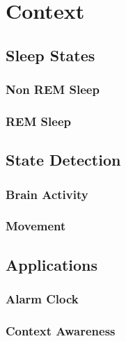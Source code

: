 \chapter{Context} %
\label{cha:context}

\section{Sleep States} %
\label{sec:sleep_states}

\subsection{Non REM Sleep} %
\label{sub:non_rem_sleep}


\subsection{REM Sleep} %
\label{sub:rem_sleep}



\section{State Detection} %
\label{sec:state_detection}

\subsection{Brain Activity} %
\label{sub:brain_activity}


\subsection{Movement} %
\label{sub:movement}



\section{Applications} %
\label{sec:applications}

\subsection{Alarm Clock} %
\label{sub:alarm_clock}


\subsection{Context Awareness} %
\label{sub:context_awareness}



